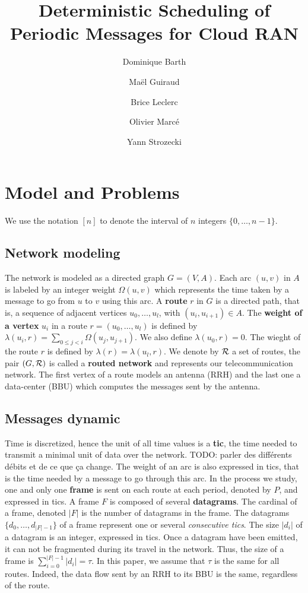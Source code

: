 \documentclass[10pt]{article}
\title{Deterministic Scheduling of Periodic Messages for Cloud RAN}
\author[1]{Dominique Barth}
\author[1,2]{Ma\"el Guiraud}
\author[2]{Brice Leclerc}
\author[2]{Olivier Marc\'e}
\author[1]{Yann Strozecki}
\affil[1]{David Laboratory, UVSQ}
\affil[2]{Nokia Bell Labs France}
\newcommand{\todo}[1]{{\color{red} TODO: {#1}}}
\begin{document}
\maketitle\section{Model and Problems}\label{sec:def}

We use the notation $[n]$ to denote the interval of $n$ integers $\{0,\dots,n-1\}$.


  \subsection{Network modeling}
  
The network is modeled as a directed graph $G=(V,A)$. Each arc  $(u,v)$ in $A$ is labeled by an integer weight $\Omega(u,v)$ which represents the time taken by a message to go from $u$ to $v$ using this arc. A {\bf route} $r$ in $G$ is a directed path, that is, a sequence of adjacent vertices $u_0, \ldots , u_{l}$, with $(u_i,u_{i+1}) \in A$.  The {\bf weight of a vertex} $u_i$ in a route $r=(u_0,\dots,u_l)$ is defined by $\lambda(u_i,r)= \sum\limits_{0 \leq j <i} \Omega(u_j, u_{j+1})$. We also define $\lambda(u_0,r)=0$. The wieght of the route $r$ is defined by $\lambda (r)= \lambda (u_l,r)$.
We denote by $\cal R$ a set of routes, the pair $(G,\cal R)$ is called a {\bf routed network} and represents our telecommunication network.
The first vertex of a route models an antenna (RRH) and the last one a data-center (BBU) which computes the messages sent by the antenna.

   \subsection{Messages dynamic}
	 
    Time is discretized, hence the unit of all time values is a {\bf tic}, the time needed to transmit a minimal unit of data over the network. \todo{parler des différents débits et de ce que ça change}. The weight of an arc is also expressed in tics, that is the time needed by a message to go through this arc.
        In the process we study, one and only one {\bf frame} is sent on each route at each period, denoted by $P$, and expressed in tics.
        A frame $F$ is composed of several {\bf datagrams}. The cardinal of a frame, denoted $|F|$ is the number of datagrams in the frame. The datagrams $\{d_0,\ldots,d_{|F|-1}\}$ of a frame represent one or several \emph{consecutive tics}. The size $|d_i|$ of a datagram is an integer, expressed in tics. Once a datagram have been emitted, it can not be fragmented during its travel in the network. Thus, the size of a frame is $\sum_{i=0}^{{|F|-1}} |d_i| = \tau$. In this paper, we assume that $\tau$ is the same for all routes. Indeed, the data flow sent by an RRH to its BBU is the same, regardless of the route.
        
\end{document}
